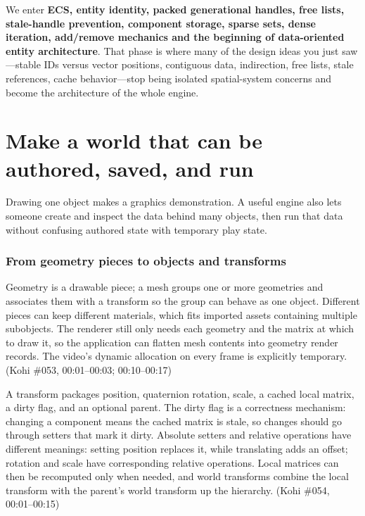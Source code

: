 We enter \textbf{ECS, entity identity, packed generational handles, free lists, stale-handle prevention, component storage, sparse sets, dense iteration, add/remove mechanics and the beginning of data-oriented entity architecture}. That phase is where many of the design ideas you just saw---stable IDs versus vector positions, contiguous data, indirection, free lists, stale references, cache behavior---stop being isolated spatial-system concerns and become the architecture of the whole engine.

\section{Make a world that can be authored, saved, and run}\label{06-engine-ii-ch031-make-a-world-that-can-be-authored-saved-and-run}

Drawing one object makes a graphics demonstration. A useful engine also lets someone create and inspect the data behind many objects, then run that data without confusing authored state with temporary play state.

\subsubsection{From geometry pieces to objects and transforms}\label{06-engine-ii-ch031-from-geometry-pieces-to-objects-and-transforms}

Geometry is a drawable piece; a mesh groups one or more geometries and associates them with a transform so the group can behave as one object. Different pieces can keep different materials, which fits imported assets containing multiple subobjects. The renderer still only needs each geometry and the matrix at which to draw it, so the application can flatten mesh contents into geometry render records. The video's dynamic allocation on every frame is explicitly temporary. (Kohi \#053, 00:01--00:03; 00:10--00:17)

A transform packages position, quaternion rotation, scale, a cached local matrix, a dirty flag, and an optional parent. The dirty flag is a correctness mechanism: changing a component means the cached matrix is stale, so changes should go through setters that mark it dirty. Absolute setters and relative operations have different meanings: setting position replaces it, while translating adds an offset; rotation and scale have corresponding relative operations. Local matrices can then be recomputed only when needed, and world transforms combine the local transform with the parent's world transform up the hierarchy. (Kohi \#054, 00:01--00:15)

